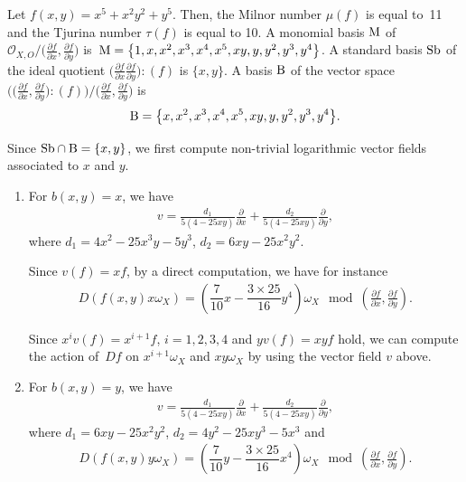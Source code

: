 \documentclass[pdftex]{sigma}%
\numberwithin{equation}{section}
\begin{document}
\begin{Example}
Let $f(x,y)=x^5+x^2y^2+y^5$. Then, the Milnor number $\mu(f)$ is equal to~11 and the Tjurina number $\tau(f)$ is equal to 10. A monomial basis ${\rm M}$ of ${\mathcal O}_{X,O}/\big(\frac{\partial f}{\partial x}, \frac{\partial f}{\partial y}\big)$ is~${\rm M} = \big\{1, x, x^2, x^3, x^4, x^5, xy, y, y^2, y^3, y^4\big\}$. A standard basis ${\rm Sb}$ of the ideal quotient
$\big(\frac{\partial f}{\partial x} \frac{\partial f}{\partial y}\big) : (f)$ is $\{x, y\}$. A basis ${\rm B}$ of the vector space $\big(\big(\frac{\partial f}{\partial x}, \frac{\partial f}{\partial y}\big) : (f)\big) / \big(\frac{\partial f}{\partial x}, \frac{\partial f}{\partial y}\big)$ is
\begin{gather*}
{\rm B} = \big\{ x, x^2, x^3, x^4, x^5, xy, y, y^2, y^3, y^4 \big\}.
\end{gather*}

Since $ {\rm Sb}\cap {\rm B} = \{ x, y \} $, we first compute non-trivial logarithmic vector fields associated to $ x $ and $y $.
\begin{enumerate}\itemsep=0pt
\item[$(i)$] For $b(x,y)=x$, we have
\begin{gather*}
v=\frac{d_1}{5(4-25xy)}\frac{\partial}{\partial x} + \frac{d_2}{5(4-25xy)}\frac{\partial}{\partial y},
\end{gather*}
where
$d_1=4x^2-25x^3y-5y^3$, $d_2=6xy-25x^2y^2$.


Since $v(f)=xf$, by a direct computation, we have for instance
\begin{gather*}
D(f(x, y)x\omega_X) = \left(\dfrac{7}{10}x-\dfrac{3\times25}{16}y^4\right)\omega_X \mod \left(\frac{\partial f}{\partial x}, \frac{\partial f}{\partial y}\right) .
\end{gather*}

Since $x^iv(f) =x^{i+1}f$, $i=1,2,3,4$ and $yv(f)=xyf$ hold, we can compute the action of~$Df$ on $x^{i+1}\omega_X$ and $xy\omega_X$
by using the vector field $v $ above.

\item[$(ii)$] For $b(x,y)=y$, we have
\begin{gather*}
v=\frac{d_1}{5(4-25xy)}\frac{\partial}{\partial x} + \frac{d_2}{5(4-25xy)}\frac{\partial}{\partial y},
\end{gather*}
where
$d_1=6xy-25x^2y^2$, $d_2=4y^2-25xy^3-5x^3$ and
\begin{gather*}
D(f(x,y)y\omega_X) = \left(\dfrac{7}{10}y-\dfrac{3\times25}{16}x^4\right)\omega_X \mod \left(\frac{\partial f}{\partial x}, \frac{\partial f}{\partial y}\right) .
\end{gather*}
\end{enumerate}


\end{Example}
\end{document}
